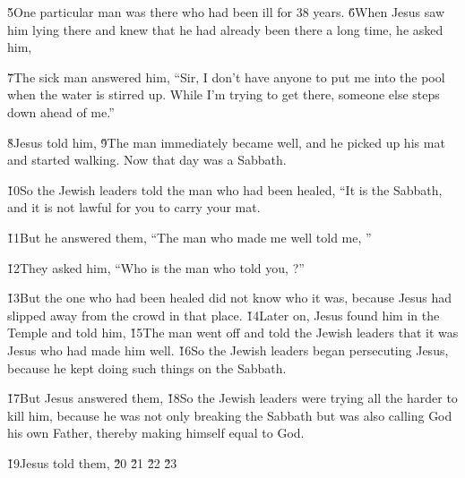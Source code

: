 \v{5}One particular man was there who had been ill for 38 years. \v{6}When Jesus saw him lying there and knew that he had already been there a long time, he asked him, 

\v{7}The sick man answered him, ``Sir, I don't have anyone to put me into the pool when the water is stirred up. While I'm trying to get there, someone else steps down ahead of me.''

\v{8}Jesus told him,  \v{9}The man immediately became well, and he picked up his mat and started walking. Now that day was a Sabbath.

\v{10}So the Jewish leaders told the man who had been healed, ``It is the Sabbath, and it is not lawful for you to carry your mat.

\v{11}But he answered them, ``The man who made me well told me, ''

\v{12}They asked him, ``Who is the man who told you, ?''

\v{13}But the one who had been healed did not know who it was, because Jesus had slipped away from the crowd in that place. \v{14}Later on, Jesus found him in the Temple and told him,  \v{15}The man went off and told the Jewish leaders that it was Jesus who had made him well. \v{16}So the Jewish leaders began persecuting Jesus, because he kept doing such things on the Sabbath.

\v{17}But Jesus answered them,  \v{18}So the Jewish leaders were trying all the harder to kill him, because he was not only breaking the Sabbath but was also calling God his own Father, thereby making himself equal to God.

\v{19}Jesus told them,   \v{20} \v{21} \v{22} \v{23}

